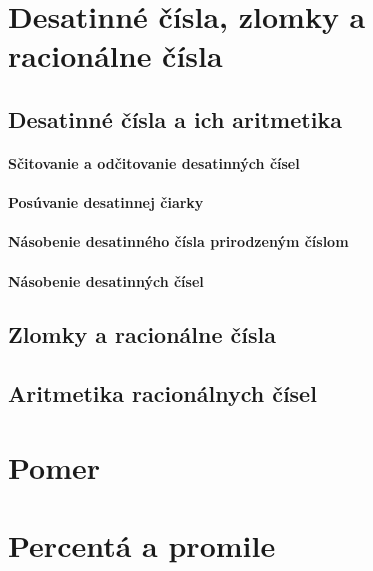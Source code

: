 \section{Desatinné čísla, zlomky a racionálne čísla}

\subsection{Desatinné čísla a ich aritmetika}

\paragraph{Sčitovanie a odčitovanie desatinných čísel}

\paragraph{Posúvanie desatinnej čiarky}

\paragraph{Násobenie desatinného čísla prirodzeným číslom}

\paragraph{Násobenie desatinných čísel}


\subsection{Zlomky a racionálne čísla}

\subsection{Aritmetika racionálnych čísel}
\newpage


\section{Pomer}
\newpage


\section{Percentá a promile}


